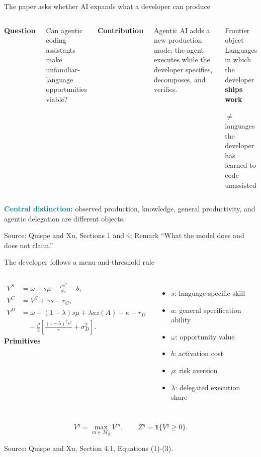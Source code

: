 \documentclass[aspectratio=169,11pt]{beamer}
\newcommand{\source}[1]{%
  \vfill\par\begingroup\color{gray!75!black}\fontsize{7}{8}\selectfont
  Source: #1\par\endgroup}
\newcommand{\key}[1]{\textcolor{Teal}{\textbf{#1}}}
\begin{document}
\begin{frame}{The paper asks whether AI expands what a developer can produce}
  \begin{columns}[T,onlytextwidth]
      \textbf{Question}\par\smallskip
      Can agentic coding assistants make unfamiliar-language opportunities viable?

      \vspace{0.45cm}
      \textbf{Contribution}\par\smallskip
      Agentic AI adds a new production mode: the agent executes while the developer specifies, decomposes, and verifies.

      \begin{block}{Frontier object}
        \centering
        Languages in which the developer \textbf{ships work}\par
        \vspace{0.2cm}
        $\neq$ languages the developer has learned to code unassisted
      \end{block}
  \end{columns}
  \vspace{0.35cm}
  \key{Central distinction:} observed production, knowledge, general productivity, and agentic delegation are different objects.
  \source{Quispe and Xu, Sections 1 and 4; Remark “What the model does and does not claim.”}
\end{frame}

\begin{frame}{The developer follows a menu-and-threshold rule}
  \begin{columns}[T,onlytextwidth]
      \begin{align*}
      V^S &= \omega+s\mu-\frac{\rho s^2}{2\pi}-b,\\
      V^C &= V^S+\gamma s-r_C,\\
      V^D &= \omega+(1-\lambda)s\mu+\lambda a z(A)-\kappa-r_D\\
          &\quad-\frac{\rho}{2}\left[\frac{(1-\lambda)^2s^2}{\pi}+\sigma_D^2\right].
      \end{align*}
      \textbf{Primitives}\par\smallskip
      \begin{itemize}\setlength\itemsep{0.22cm}
        \item \(s\): language-specific skill
        \item \(a\): general specification ability
        \item \(\omega\): opportunity value
        \item \(b\): activation cost
        \item \(\rho\): risk aversion
        \item \(\lambda\): delegated execution share
      \end{itemize}
  \end{columns}
  \vspace{0.15cm}
  \[
    V^g=\max_{m\in\mathcal M_g}V^m,\qquad Z^g=\mathbf1\{V^g\ge0\}.
  \]
  \source{Quispe and Xu, Section 4.1, Equations (1)-(3).}
\end{frame}
\end{document}
